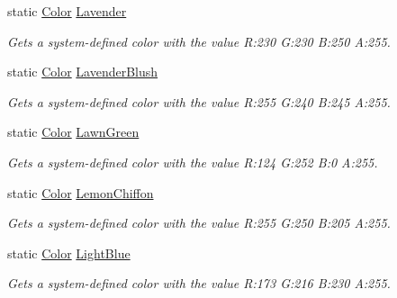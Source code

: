 \begin{DoxyCompactItemize}
static \hyperlink{struct_microsoft_1_1_xna_1_1_framework_1_1_color}{Color} \hyperlink{struct_microsoft_1_1_xna_1_1_framework_1_1_color_ad9d6b5e1558649924e9c933ee5ee64f8}{Lavender}
\begin{DoxyCompactList}\small\item\em Gets a system-\/defined color with the value R\+:230 G\+:230 B\+:250 A\+:255.\end{DoxyCompactList}\item 
static \hyperlink{struct_microsoft_1_1_xna_1_1_framework_1_1_color}{Color} \hyperlink{struct_microsoft_1_1_xna_1_1_framework_1_1_color_a70212ff0c7ef986dfc9a4f92d4d6d7e6}{Lavender\+Blush}
\begin{DoxyCompactList}\small\item\em Gets a system-\/defined color with the value R\+:255 G\+:240 B\+:245 A\+:255.\end{DoxyCompactList}\item 
static \hyperlink{struct_microsoft_1_1_xna_1_1_framework_1_1_color}{Color} \hyperlink{struct_microsoft_1_1_xna_1_1_framework_1_1_color_ada62f15cbd4a258debde425a465768f1}{Lawn\+Green}
\begin{DoxyCompactList}\small\item\em Gets a system-\/defined color with the value R\+:124 G\+:252 B\+:0 A\+:255.\end{DoxyCompactList}\item 
static \hyperlink{struct_microsoft_1_1_xna_1_1_framework_1_1_color}{Color} \hyperlink{struct_microsoft_1_1_xna_1_1_framework_1_1_color_aa767451940ce4f779f38e30c512f4425}{Lemon\+Chiffon}
\begin{DoxyCompactList}\small\item\em Gets a system-\/defined color with the value R\+:255 G\+:250 B\+:205 A\+:255.\end{DoxyCompactList}\item 
static \hyperlink{struct_microsoft_1_1_xna_1_1_framework_1_1_color}{Color} \hyperlink{struct_microsoft_1_1_xna_1_1_framework_1_1_color_a6f98156fcd27baf36d81b672d995171b}{Light\+Blue}
\begin{DoxyCompactList}\small\item\em Gets a system-\/defined color with the value R\+:173 G\+:216 B\+:230 A\+:255.\end{DoxyCompactList}\item 

\end{DoxyCompactItemize}
